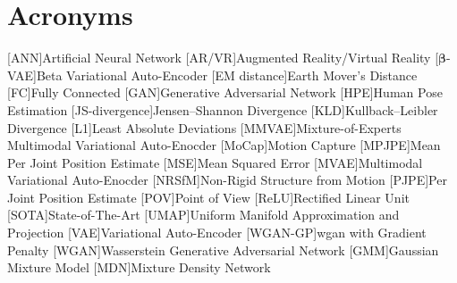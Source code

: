 \chapter*{Acronyms}

\begin{acronym}[TBD]
    [ANN]{Artificial Neural Network}
    [AR/VR]{Augmented Reality/Virtual Reality}
    [$\boldsymbol{\beta}$-VAE]{Beta Variational Auto-Encoder}
    [EM distance]{Earth Mover's Distance}
    [FC]{Fully Connected}
    [GAN]{Generative Adversarial Network}
    [HPE]{Human Pose Estimation}
    [JS-divergence]{Jensen–Shannon Divergence}
    [KLD]{Kullback–Leibler Divergence}
    [L1]{Least Absolute Deviations}
    [MMVAE]{Mixture-of-Experts Multimodal Variational Auto-Enocder}
    [MoCap]{Motion Capture}
    [MPJPE]{Mean Per Joint Position Estimate}
    [MSE]{Mean Squared Error}
    [MVAE]{Multimodal Variational Auto-Enocder}
    [NRSfM]{Non-Rigid Structure from Motion}
    [PJPE]{Per Joint Position Estimate}
    [POV]{Point of View}
    [ReLU]{Rectified Linear Unit}
    [SOTA]{State-of-The-Art}
    [UMAP]{Uniform Manifold Approximation and Projection}
    [VAE]{Variational Auto-Encoder}
    [WGAN-GP]{\ac{wgan} with Gradient Penalty}
    [WGAN]{Wasserstein Generative Adversarial Network}
    [GMM]{Gaussian Mixture Model}
    [MDN]{Mixture Density Network}
\end{acronym}

